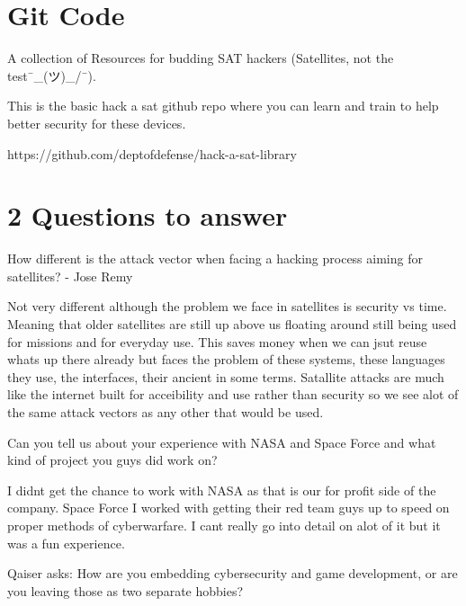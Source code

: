 \section{Git Code}
A collection of Resources for budding SAT hackers (Satellites, not the test¯\_(ツ)_/¯).

This is the basic hack a sat github repo where you can learn and train to help better security for these devices.

https://github.com/deptofdefense/hack-a-sat-library

\section{2 Questions to answer}
How different is the attack vector when facing a hacking process aiming for satellites? - Jose Remy

Not very different although the problem we face in satellites is security vs time. Meaning that older satellites are still up above us floating around still being used for missions and for everyday use. This saves money when we can jsut reuse whats up there already but faces the problem of these systems, these languages they use, the interfaces, their ancient in some terms. Satallite attacks are much like the internet built for acceibility and use rather than security so we see alot of the same attack vectors as any other that would be used.

Can you tell us about your experience with NASA and Space Force and what kind of project you guys did work on?

I didnt get the chance to work with NASA as that is our for profit side of the company. Space Force I worked with getting their red team guys up to speed on proper methods of cyberwarfare. I cant really go into detail on alot of it but it was a fun experience.

Qaiser asks: How are you embedding cybersecurity and game development, or are you leaving those as two separate hobbies?




%
